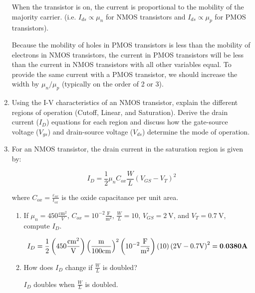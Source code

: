 \documentclass[fleqn]{article}
\begin{document}
\begin{enumerate}
		When the transistor is on, the current is proportional to the mobility of the majority carrier. (i.e. $I_{ds} \propto \mu_n$ for NMOS transistors and $I_{ds} \propto \mu_p$ for PMOS transistors).
		
		Because the mobility of holes in PMOS transistors is less than the mobility of electrons in NMOS transistors, the current in PMOS transistors will be less than the current in NMOS transistors with all other variables equal. To provide the same current with a PMOS transistor, we should increase the width by $\mu_n/\mu_p$ (typically on the order of 2 or 3).
		
		\item Using the I-V characteristics of an NMOS transistor, explain the different regions of operation (Cutoff, Linear, and Saturation). Derive the drain current ($I_D$) equations for each region and discuss how the gate-source voltage ($V_{gs}$) and drain-source voltage ($V_{ds}$) determine the mode of operation. 

		\item For an NMOS transistor, the drain current in the saturation region is given by:
		
		\begin{equation*}
			I_D = \frac{1}{2}{\mu_n}{C_{ox}}\frac{W}{L}(V_{GS}-V_{T})^2
		\end{equation*}
		
		where $C_{ox} = \frac{\varepsilon_{ox}}{t_{ox}}$ is the oxide capacitance per unit area.
		
		\begin{enumerate}
			\item If $\mu_n = 450 \frac{\text{cm}^2}{V}$, $C_{ox} = 10^{-2}\frac{\text{F}}{\text{m}^2}$, $\frac{W}{L} = 10$, $V_{GS} = 2\ \text{V}$, and $V_T = 0.7\ \text{V}$, compute $I_D$.
			
			\begin{equation*}
				I_D = \frac{1}{2}\left(450\frac{\text{cm}^2}{\text{V}}\right)\left(\frac{\text{m}}{100\text{cm}}\right)^2\left(10^{-2}\frac{\text{F}}{\text{m}^2}\right)(10)\left(2\text{V} - 0.7\text{V}\right)^2 = \mathbf{0.0380 \textbf{\text{A}}}
			\end{equation*}
			
			\item How does $I_D$ change if $\frac{W}{L}$ is doubled?
			
			$I_D$ doubles when $\frac{W}{L}$ is doubled.
			
		\end{enumerate}
		

\end{enumerate}
\end{document}
